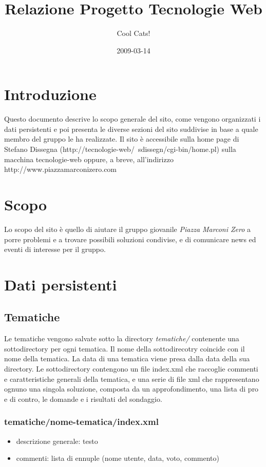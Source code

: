 \documentclass[a4paper,10pt]{article}
\author{Cool Cats!}
\title{Relazione Progetto Tecnologie Web}
\date{2009-03-14}
\begin{document}
\maketitle

\section{Introduzione}
Questo documento descrive lo scopo generale del sito, come vengono organizzati i dati persistenti e poi presenta le diverse sezioni del sito suddivise in base a quale membro del gruppo le ha realizzate. Il sito \`e accessibile sulla home page di Stefano Dissegna (http://tecnologie-web/~sdissegn/cgi-bin/home.pl) sulla macchina tecnologie-web oppure, a breve, all'indirizzo http://www.piazzamarconizero.com

\section{Scopo}
Lo scopo del sito \`e quello di aiutare il gruppo giovanile \textit{Piazza Marconi Zero} a porre problemi e a trovare possibili soluzioni condivise, e di comunicare news ed eventi di interesse per il gruppo.

\section{Dati persistenti}

\subsection{Tematiche}
Le tematiche vengono salvate sotto la directory \textit{tematiche/} contenente una sottodirectory per ogni tematica. Il nome della sottodirecotry coincide con il nome della tematica. La data di una tematica viene presa dalla data della sua  directory.
Le sottodirectory contengono un file index.xml che raccoglie commenti e caratteristiche generali della tematica, e una serie di file xml che rappresentano ognuno una singola soluzione, composta da un approfondimento, una lista di pro e di contro, le domande e i risultati del sondaggio.
\subsubsection{tematiche/nome-tematica/index.xml}
\begin{itemize}
 \item descrizione generale: testo
 \item commenti: lista di ennuple (nome utente, data, voto, commento)
\end{itemize}
\end{document}
